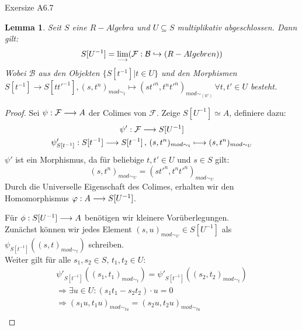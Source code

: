 \documentclass[10pt,a4paper]{report}
\newcommand{\comment}[1]{}
\newcounter{Aussage}[chapter]
\newtheorem{lemma}[Aussage]{Lemma}
\newcommand{\functionfront}[3]{\nolinebreak{#1:#2 \longrightarrow #3}}
\newcommand{\function}[5]{\nolinebreak{#1:#2 \longrightarrow #3 \, , \, #4 \longmapsto #5}}
\newcommand{\lok}[2]{#1 [#2^{-1}]}
\newcommand{\loke}[3]{(#1,#2)_{mod\sim_{#3}}}
\newcommand{\colimes}[0]{\lim\limits_{ \longrightarrow }}
\newcommand{\infunctionfront}[3]{\nolinebreak{#1:#2 \hookrightarrow #3}}
\begin{document}
Exersize A6.7
\begin{lemma}\comment{\label{Lokalisierung als Colimes}}
Seit $S$ eine $R-Algebra$ und $U \subseteq S$ multiplikativ abgeschlossen.
Dann gilt:
\begin{gather*}
 S[U^{-1}] = \colimes (\infunctionfront{\mathcal{F}}{\mathcal{B}}{(R-Algebren)})
\end{gather*}
Wobei $\mathcal{B}$ aus den Objekten $\lbrace \lok{S}{t} \vert t \in U \rbrace$ und den Morphismen\\
$\lok{S}{t} \longrightarrow \lok{S}{tt'}, \loke{s}{t^n}{t} \longmapsto \loke{st'^n}{t^nt'^n}{(tt')} \,
\forall t,t' \in U$ besteht.\\
\end{lemma}
\begin{proof}
Sei $\functionfront{\psi}{\mathcal{F}}{A}$ der Colimes von $\mathcal{F}$. Zeige $\lok{S}{U} \simeq A$, definiere dazu:
\begin{gather*}
\functionfront{\psi'}{\mathcal{F}}{\lok{S}{U}}\\
\function{\psi'_{\lok{S}{t}}}{\lok{S}{t}}{\lok{S}{t}}{\loke{s}{t^n}{t}}{\loke{s}{t^n}{U}}
\end{gather*}
$\psi'$ ist ein Morphismus, da für beliebige $t,t' \in U$ und $s \in S$ gilt:
$$\loke{s}{t^n}{U} = \loke{st'^n}{t^nt'^n}{U}$$
Durch die Universelle Eigenschaft des Colimes, erhalten wir den Homomorphismus $\functionfront{\varphi}{A}{\lok{S}{U}}$.
\begin{center}
\end{center}
Für $\functionfront{\phi}{S[U^{-1}]}{A}$ benötigen wir kleinere Vorüberlegungen.\\
Zunächst können wir jedes Element $(s,u)_{mod\sim_{U}} \in \lok{S}{U}$ als $\psi_{\lok{S}{t}}(\loke{s}{t}{t})$ schreiben.\\
\comment{\label{wobei u = t}}
Weiter gilt für alle $s_1,s_2 \in S , \, t_1,t_2 \in U$: 
\begin{align*}
\psi'_{\lok{S}{t}}(\loke{s_1}{t_1}{t}) = \psi'_{\lok{S}{t}}(\loke{s_2}{t_2}{t})\\
\Rightarrow  \exists u \in U: (s_1t_1 - s_2t_2) \cdot u = 0\\
\Rightarrow  \loke{s_1u}{t_1u}{tu} = \loke{s_2u}{t_2u}{tu}\\

\end{align*}
\end{proof}
\end{document}
